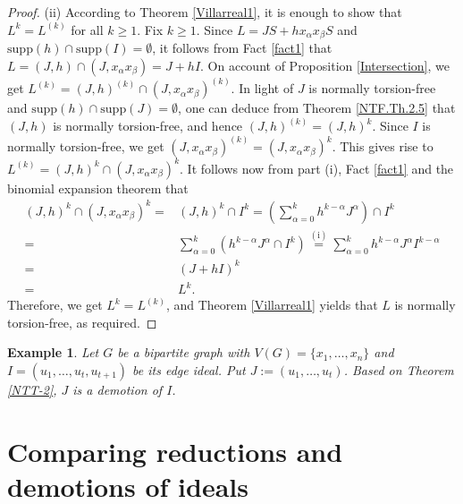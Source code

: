 \documentclass[11pt]{amsart}
\newtheorem{example}[theorem]{Example}
\begin{document}
\begin{proof}
(ii)  According to  Theorem \ref{Villarreal1}, it is enough to show that  $L^k=L^{(k)}$ for all  $k\geq 1$. Fix   $k\geq 1$.  
 Since     $L=JS+ hx_\alpha x_\beta S$ and  $\mathrm{supp}(h) \cap  \mathrm{supp}(I)=\emptyset$, it follows from Fact \ref{fact1} that $L=(J, h) \cap (J, x_\alpha x_\beta)=J+ hI$.  On account of   Proposition \ref{Intersection}, we get  $L^{(k)}=(J, h)^{(k)} \cap (J, x_\alpha x_\beta)^{(k)}$.  In light of $J$ is normally torsion-free and  $\mathrm{supp}(h) \cap  \mathrm{supp}(J)=\emptyset$, one can  deduce from Theorem \ref{NTF.Th.2.5}  that $(J, h)$ is normally 
 torsion-free, and hence $(J, h)^{(k)}=(J, h)^{k}$.  Since $I$ is normally torsion-free, we get $(J, x_\alpha x_\beta)^{(k)}= (J, x_\alpha x_\beta)^{k}$.
  This gives rise to    $L^{(k)}=(J, h)^{k} \cap (J, x_\alpha x_\beta)^{k}$.  It follows now from part (i),  Fact \ref{fact1} and  the binomial expansion theorem
   that 
 \begin{align*}
  (J, h)^k  \cap (J, x_\alpha x_\beta)^k=& (J, h)^k  \cap I^k=   \left(\sum_{\alpha=0}^{k}h^{k-\alpha}J^{\alpha}\right) \cap  I^k\\
  = &\sum_{\alpha=0}^{k} (h^{k-\alpha}J^{\alpha} \cap  I^k) \overset{(\text{i})}{=}  \sum_{\alpha=0}^{k} h^{k-\alpha}J^{\alpha}   I^{k-\alpha} \\
  =& (J+ hI)^k\\
  =& L^k.
  \end{align*}
Therefore,   we get $L^{k}=L^{(k)}$, and  Theorem \ref{Villarreal1} yields  that $L$ is normally torsion-free, as required. 
 \end{proof} 
 

\begin{example}
\em{
Let   $G$ be  a  bipartite graph with $V(G)=\{x_1, \ldots, x_n\}$ and $I=(u_1, \ldots, u_t, u_{t+1})$ be  its edge ideal. 
 Put $J:=(u_1, \ldots, u_t)$. Based on Theorem  \ref{NTT-2},   $J$ is  a demotion of $I$.
 }
 \end{example}
 
 

\section{Comparing reductions and demotions of ideals} \label{Section 7}
\end{document}
